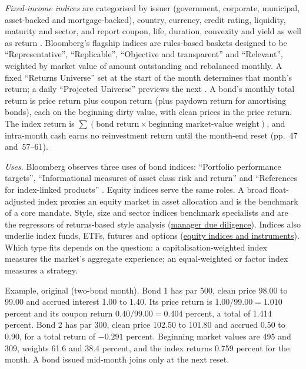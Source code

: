 \begin{qfdefinition}
\emph{Fixed-income indices} are categorised by issuer (government, corporate, municipal, asset-backed and mortgage-backed), country, currency, credit rating, liquidity, maturity and sector, and report coupon, life, duration, convexity and yield as well as return \citep[pp.~111--112]{wide-bacon-attribution}. Bloomberg's flagship indices are rules-based baskets designed to be ``Representative'', ``Replicable'', ``Objective and transparent'' and ``Relevant'', weighted by market value of amount outstanding and rebalanced monthly. A fixed ``Returns Universe'' set at the start of the month determines that month's return; a daily ``Projected Universe'' previews the next \citep[pp.~9 and~42--43]{fixed-income-index-methodology-2026}. A bond's monthly total return is price return plus coupon return (plus paydown return for amortising bonds), each on the beginning dirty value, with clean prices in the price return. The index return is $\sum(\text{bond return}\times\text{beginning market-value weight})$, and intra-month cash earns no reinvestment return until the month-end reset (pp.~47 and~57--61).

 \emph{Uses.} Bloomberg observes three uses of bond indices: ``Portfolio performance targets'', ``Informational measures of asset class risk and return'' and ``References for index-linked products'' \citep[p.~9]{fixed-income-index-methodology-2026}. Equity indices serve the same roles. A broad float-adjusted index proxies an equity market in asset allocation and is the benchmark of a core mandate. Style, size and sector indices benchmark specialists and are the regressors of returns-based style analysis (\hyperref[meth:manager-due-diligence]{manager due diligence}). Indices also underlie index funds, ETFs, futures and options (\hyperref[def:equity-indices-derivatives]{equity indices and instruments}). Which type fits depends on the question: a capitalisation-weighted index measures the market's aggregate experience; an equal-weighted or factor index measures a strategy.

Example, original (two-bond month). Bond 1 has par 500, clean price 98.00 to 99.00 and accrued interest 1.00 to 1.40. Its price return is $1.00/99.00=1.010$ percent and its coupon return $0.40/99.00=0.404$ percent, a total of 1.414 percent. Bond 2 has par 300, clean price 102.50 to 101.80 and accrued 0.50 to 0.90, for a total return of $-0.291$ percent. Beginning market values are 495 and 309, weights 61.6 and 38.4 percent, and the index returns 0.759 percent for the month. A bond issued mid-month joins only at the next reset.


\end{qfdefinition}
